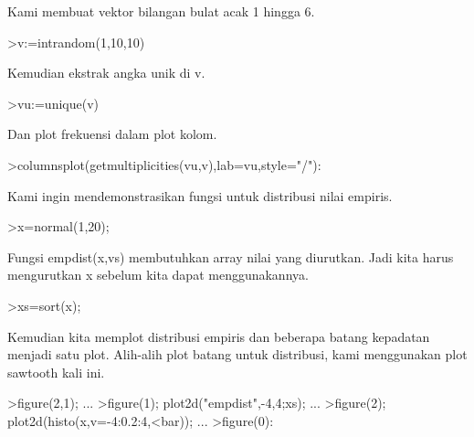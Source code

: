 \documentclass[a4paper,10pt]{article}
\begin{document}
\begin{eulernotebook}
\begin{eulercomment}
Kami membuat vektor bilangan bulat acak 1 hingga 6.
\end{eulercomment}
\begin{eulerprompt}
>v:=intrandom(1,10,10)
\end{eulerprompt}
\begin{euleroutput}
  [8,  5,  8,  8,  6,  8,  8,  3,  5,  5]
\end{euleroutput}
\begin{eulercomment}
Kemudian ekstrak angka unik di v.
\end{eulercomment}
\begin{eulerprompt}
>vu:=unique(v)
\end{eulerprompt}
\begin{euleroutput}
  [3,  5,  6,  8]
\end{euleroutput}
\begin{eulercomment}
Dan plot frekuensi dalam plot kolom.
\end{eulercomment}
\begin{eulerprompt}
>columnsplot(getmultiplicities(vu,v),lab=vu,style="/"):
\end{eulerprompt}
\begin{eulercomment}
Kami ingin mendemonstrasikan fungsi untuk distribusi nilai empiris.
\end{eulercomment}
\begin{eulerprompt}
>x=normal(1,20);
\end{eulerprompt}
\begin{eulercomment}
Fungsi empdist(x,vs) membutuhkan array nilai yang diurutkan. Jadi kita
harus mengurutkan x sebelum kita dapat menggunakannya.
\end{eulercomment}
\begin{eulerprompt}
>xs=sort(x);
\end{eulerprompt}
\begin{eulercomment}
Kemudian kita memplot distribusi empiris dan beberapa batang kepadatan
menjadi satu plot. Alih-alih plot batang untuk distribusi, kami
menggunakan plot sawtooth kali ini.
\end{eulercomment}
\begin{eulerprompt}
>figure(2,1); ...
>figure(1); plot2d("empdist",-4,4;xs); ...
>figure(2); plot2d(histo(x,v=-4:0.2:4,<bar));  ...
>figure(0):
\end{eulerprompt}
\begin{eulercomment}

\end{eulercomment}
\end{eulernotebook}
\end{document}
